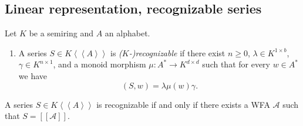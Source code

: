 \subsection{Linear representation, recognizable series}

\begin{definition}
    Let $K$ be a semiring and $A$ an alphabet.
    \begin{enumerate}[(1)]
        \item A series $S \in K \left<\left<A\right>\right>$ is \emph{($K$-)recognizable}
        if there exist $n \ge 0$, $\lambda \in K^{1 \times b}$, $\gamma \in K^{n \times 1}$,
        and a monoid morphism $\mu \colon A^* \to K^{d \times d}$ such that for every 
        $w \in A^*$ we have
        \[
            (S, w) = \lambda \mu(w) \gamma.
        \]
    \end{enumerate}
\end{definition}

\begin{proposition}
    A series $S \in K \left<\left<A\right>\right>$ is recognizable if and only 
    if there exists a WFA $\mathcal{A}$ such that $S = [[\mathcal{A}]]$.
\end{proposition}